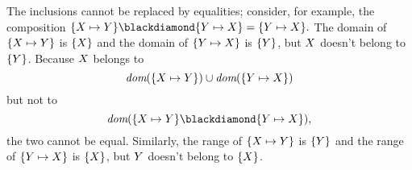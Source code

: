 \documentclass[runningheads]{llncs}
\begin{document}
 The inclusions cannot be replaced by equalities; consider, for example, the composition $\{\var{X} \mapsto \var{Y}\} \compose \{\var{Y} \mapsto \var{X}\} = \{\var{Y} \mapsto \var{X}\}.$
 The domain of $\{X \mapsto Y\}$ is $\{X\}$ 
 and the domain of $\{Y \mapsto X\}$ 
 is $\{Y\}$, but $X$ doesn't belong to $\{Y\}$.  Because $X$ belongs to 
 \[\emph{dom}(\{X \mapsto Y\}) \cup \emph{dom}(\{Y \mapsto X\})\] but not to 
 \[\dom(
 \{\var{X} \mapsto \var{Y}\} 
 \compose 
 \{\var{Y} \mapsto \var{X}\}),\] 
 the two cannot be equal.
 Similarly, the range of  $\{X \mapsto Y\}$ is $\{Y\}$ and the range of $\{Y \mapsto X\}$ is $\{X\}$, but $Y$ doesn't belong to $\{X\}$.
\end{document}
